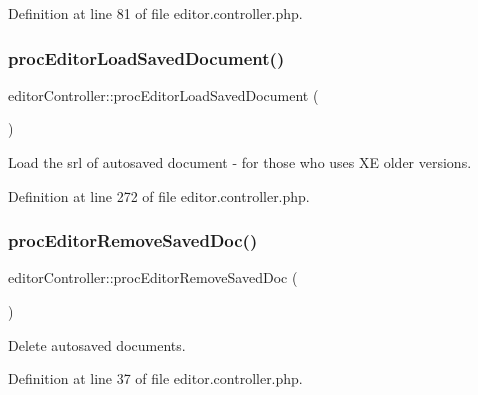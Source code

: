 Definition at line 81 of file editor.\+controller.\+php.

\hypertarget{classeditorController_a00edb6a2633a7578c40bda1cba61f041}{}\label{classeditorController_a00edb6a2633a7578c40bda1cba61f041} 
\subsubsection{\texorpdfstring{proc\+Editor\+Load\+Saved\+Document()}{procEditorLoadSavedDocument()}}
{\footnotesize\ttfamily editor\+Controller\+::proc\+Editor\+Load\+Saved\+Document (\begin{DoxyParamCaption}{ }\end{DoxyParamCaption})}



Load the srl of autosaved document -\/ for those who uses XE older versions. 



Definition at line 272 of file editor.\+controller.\+php.

\hypertarget{classeditorController_a869072fefa3ae722ecc0e0123b5f8bbd}{}\label{classeditorController_a869072fefa3ae722ecc0e0123b5f8bbd} 
\subsubsection{\texorpdfstring{proc\+Editor\+Remove\+Saved\+Doc()}{procEditorRemoveSavedDoc()}}
{\footnotesize\ttfamily editor\+Controller\+::proc\+Editor\+Remove\+Saved\+Doc (\begin{DoxyParamCaption}{ }\end{DoxyParamCaption})}



Delete autosaved documents. 



Definition at line 37 of file editor.\+controller.\+php.

\hypertarget{classeditorController_a671035df077f460bc8c60dcea0410344}{}\label{classeditorController_a671035df077f460bc8c60dcea0410344} 
